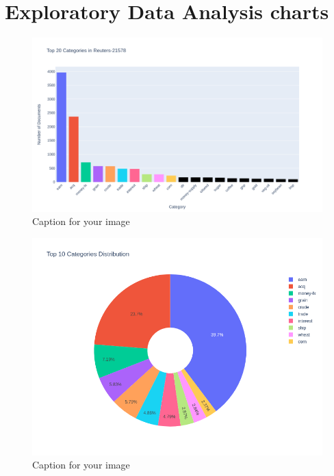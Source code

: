 \documentclass{article}
\begin{document}
\section{Exploratory Data Analysis charts}\label{sec:EDA_charts}
\begin{figure}[h!]
  \centering
  \includegraphics[width=1\textwidth]{reuter1.png} 
  \caption{Caption for your image}
  \label{fig:your-label}
\end{figure}
\begin{figure}[h!]
  \centering
  \includegraphics[width=1\textwidth]{reuter2.png} 
  \caption{Caption for your image}
  \label{fig:your-label}
\end{figure}
\end{document}
